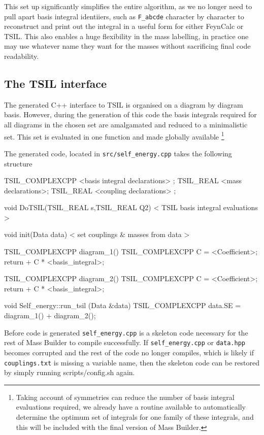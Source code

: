 This set up significantly simplifies the entire algorithm, as we no longer need to pull apart basis integral identiiers, such as \lstinline{F_abcde} character by character to reconstruct and print out the integral in a useful form for either FeynCalc or TSIL.  This also enables a huge flexibility in the mass labelling, in practice one may use whatever name they want for the masses without sacrificing final code readability.



\subsection{The TSIL interface}

The generated C++ interface to TSIL is organised on a diagram by diagram basis.  However, during the generation of this code the basis integrals required for all diagrams in the chosen set are amalgamated and reduced to a minimalistic set.  This set is evaluated in one function and made globally available \footnote{Taking account of symmetries can reduce the number of basis integral evaluations required, we already have a routine available to automatically determine the optimum set of integrals for one family of these integrals, and this will be included with the final version of Mass Builder.}

The generated code, located in \lstinline{src/self_energy.cpp} takes the following structure
\begin{lstcpp}
TSIL_COMPLEXCPP  <basis integral declarations> ;
TSIL_REAL  <mass declarations>;
TSIL_REAL  <coupling declarations> ;

void DoTSIL(TSIL_REAL s,TSIL_REAL Q2)
{
< TSIL basis integral evaluations >
}

void init(Data data) 
{
< set couplings & masses from data >
}

TSIL_COMPLEXCPP  diagram_1()
{
TSIL_COMPLEXCPP C =  <Coefficient>;
return  + C * <basis_integral>;
}

TSIL_COMPLEXCPP  diagram_2()
{
TSIL_COMPLEXCPP C =  <Coefficient>;
return  + C * <basis_integral>;
}

void Self_energy::run_tsil (Data &data) 
{
TSIL_COMPLEXCPP data.SE = diagram_1() + diagram_2();
}
\end{lstcpp}

Before code is generated \lstinline{self_energy.cpp} is a skeleton code necessary for the rest of Mass Builder to compile successfully.  If \lstinline{self_energy.cpp} or \lstinline{data.hpp} becomes corrupted and the rest of the code no longer compiles, which is likely if \lstinline{couplings.txt} is missing a variable name, then the skeleton code can be restored by simply running scripts/config.sh again.

